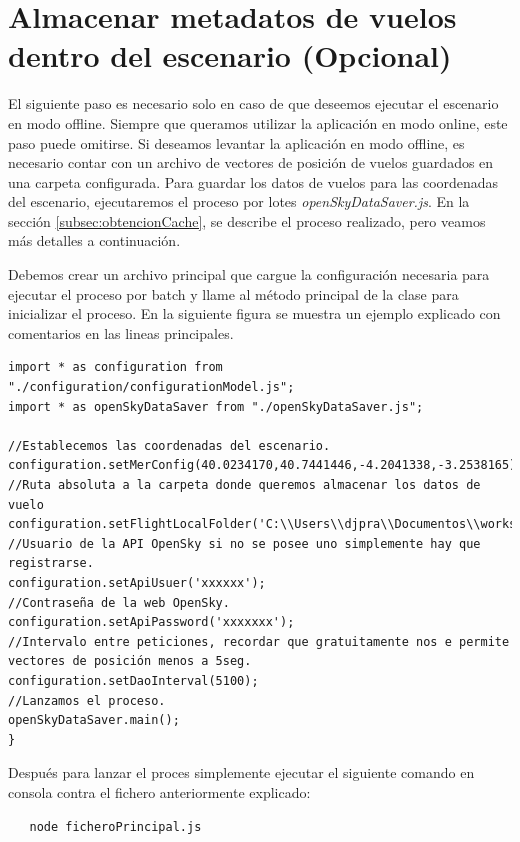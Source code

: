 \documentclass[a4paper, 11pt]{book}
\begin{document}
\section{Almacenar metadatos de vuelos dentro del escenario (Opcional)}
El siguiente paso es necesario solo en caso de que deseemos ejecutar el escenario en modo offline. Siempre que queramos utilizar la aplicación en modo online, este paso puede omitirse.
Si deseamos levantar la aplicación en modo offline, es necesario contar con un archivo de vectores de posición de vuelos guardados en una carpeta configurada. Para guardar los datos de vuelos para las coordenadas del escenario, ejecutaremos el proceso por lotes \emph{openSkyDataSaver.js}. En la sección \ref{subsec:obtencionCache}, se describe el proceso realizado, pero veamos más detalles a continuación.

Debemos crear un archivo principal que cargue la configuración necesaria para ejecutar el proceso por batch y llame al método principal de la clase para inicializar el proceso. En la siguiente figura se muestra un ejemplo explicado con comentarios en las lineas principales.
\begin{verbatim}
import * as configuration from "./configuration/configurationModel.js";
import * as openSkyDataSaver from "./openSkyDataSaver.js";

//Establecemos las coordenadas del escenario.
configuration.setMerConfig(40.0234170,40.7441446,-4.2041338,-3.2538165);
//Ruta absoluta a la carpeta donde queremos almacenar los datos de vuelo
configuration.setFlightLocalFolder('C:\\Users\\djpra\\Documentos\\workspaceTFG\\........');
//Usuario de la API OpenSky si no se posee uno simplemente hay que registrarse.
configuration.setApiUsuer('xxxxxx');
//Contraseña de la web OpenSky.
configuration.setApiPassword('xxxxxxx');
//Intervalo entre peticiones, recordar que gratuitamente nos e permite vectores de posición menos a 5seg.
configuration.setDaoInterval(5100);
//Lanzamos el proceso.
openSkyDataSaver.main();
}
\end{verbatim}

Después para lanzar el proces simplemente ejecutar el siguiente comando en consola contra el fichero anteriormente explicado:
{\scriptsize
    \begin{verbatim}
   node ficheroPrincipal.js
    \end{verbatim}
}
\end{document}
